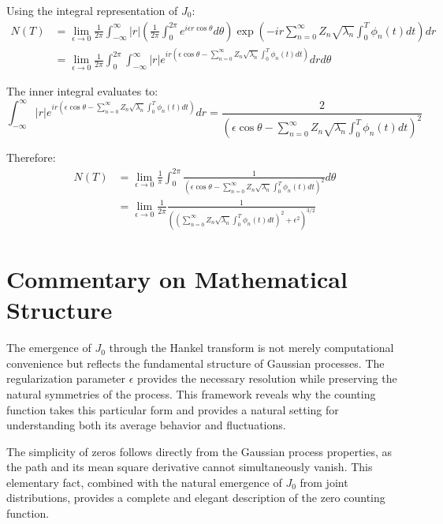 \documentclass{article}
\begin{document}
Using the integral representation of $J_0$:
\begin{equation}
\begin{split}
    N(T) &= \lim_{\epsilon \to 0} \frac{1}{2\pi} \int_{-\infty}^{\infty} |r| \left(\frac{1}{2\pi} \int_0^{2\pi} e^{i\epsilon r\cos\theta} d\theta\right) \exp\left(-ir\sum_{n=0}^{\infty} Z_n \sqrt{\lambda_n} \int_0^T \phi_n(t) dt\right) dr \\
    &= \lim_{\epsilon \to 0} \frac{1}{2\pi} \int_0^{2\pi} \int_{-\infty}^{\infty} |r| e^{ir(\epsilon\cos\theta - \sum_{n=0}^{\infty} Z_n \sqrt{\lambda_n} \int_0^T \phi_n(t) dt)} dr d\theta
\end{split}
\end{equation}

The inner integral evaluates to:
\begin{equation}
    \int_{-\infty}^{\infty} |r| e^{ir(\epsilon\cos\theta - \sum_{n=0}^{\infty} Z_n \sqrt{\lambda_n} \int_0^T \phi_n(t) dt)} dr = \frac{2}{(\epsilon\cos\theta - \sum_{n=0}^{\infty} Z_n \sqrt{\lambda_n} \int_0^T \phi_n(t) dt)^2}
\end{equation}

Therefore:
\begin{equation}
\begin{split}
    N(T) &= \lim_{\epsilon \to 0} \frac{1}{\pi} \int_0^{2\pi} \frac{1}{(\epsilon\cos\theta - \sum_{n=0}^{\infty} Z_n \sqrt{\lambda_n} \int_0^T \phi_n(t) dt)^2} d\theta \\
    &= \lim_{\epsilon \to 0} \frac{1}{2\pi} \frac{1}{((\sum_{n=0}^{\infty} Z_n \sqrt{\lambda_n} \int_0^T \phi_n(t) dt)^2 + \epsilon^2)^{3/2}}
\end{split}
\end{equation}

\section*{Commentary on Mathematical Structure}
The emergence of $J_0$ through the Hankel transform is not merely computational convenience but reflects the fundamental structure of Gaussian processes. The regularization parameter $\epsilon$ provides the necessary resolution while preserving the natural symmetries of the process. This framework reveals why the counting function takes this particular form and provides a natural setting for understanding both its average behavior and fluctuations.

The simplicity of zeros follows directly from the Gaussian process properties, as the path and its mean square derivative cannot simultaneously vanish. This elementary fact, combined with the natural emergence of $J_0$ from joint distributions, provides a complete and elegant description of the zero counting function.
\end{document}
